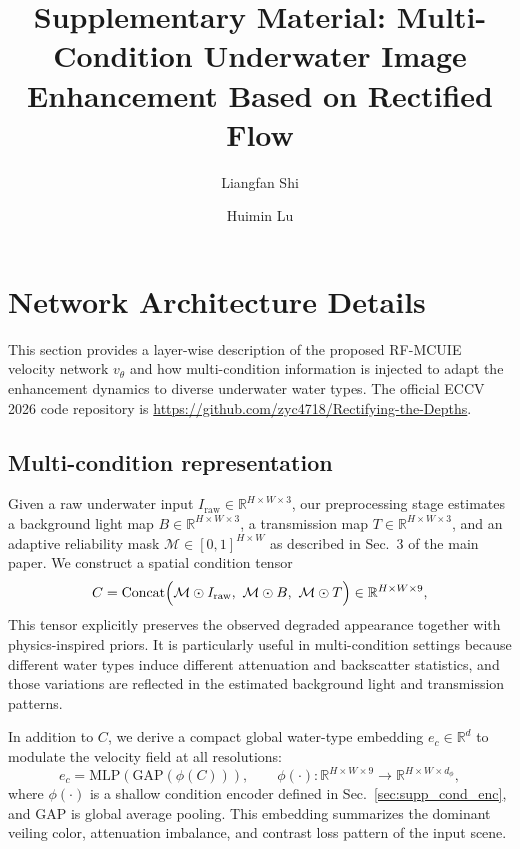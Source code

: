 \documentclass[runningheads]{llncs}
\begin{document}
\title{Supplementary Material: Multi-Condition Underwater Image Enhancement Based on Rectified Flow}

\author{Liangfan Shi \and Huimin Lu}


\maketitle

\section{Network Architecture Details}
\label{sec:supp_arch}

This section provides a layer-wise description of the proposed RF-MCUIE velocity network $v_{\theta}$ and how multi-condition information is injected to adapt the enhancement dynamics to diverse underwater water types. The official ECCV 2026 code repository is \url{https://github.com/zyc4718/Rectifying-the-Depths}.

\subsection{Multi-condition representation}
\label{sec:supp_cond_rep}

Given a raw underwater input $I_{\mathrm{raw}}\in\mathbb{R}^{H\times W\times 3}$, our preprocessing stage estimates a background light map $B\in\mathbb{R}^{H\times W\times 3}$, a transmission map $T\in\mathbb{R}^{H\times W\times 3}$, and an adaptive reliability mask $\mathcal{M}\in[0,1]^{H\times W}$ as described in Sec.~3 of the main paper. We construct a spatial condition tensor
\begin{equation}
C = \mathrm{Concat}\Bigl(\mathcal{M}\odot I_{\mathrm{raw}},\ \mathcal{M}\odot B,\ \mathcal{M}\odot T\Bigr)\in\mathbb{R}^{H\times W\times 9},
\label{eq:supp_cond_tensor}
\end{equation}
This tensor explicitly preserves the observed degraded appearance together with physics-inspired priors. It is particularly useful in multi-condition settings because different water types induce different attenuation and backscatter statistics, and those variations are reflected in the estimated background light and transmission patterns.

In addition to $C$, we derive a compact global water-type embedding $e_c\in\mathbb{R}^{d}$ to modulate the velocity field at all resolutions:
\begin{equation}
e_c = \mathrm{MLP}\!\left(\mathrm{GAP}\!\left(\phi(C)\right)\right),
\qquad \phi(\cdot):\mathbb{R}^{H\times W\times 9}\rightarrow\mathbb{R}^{H\times W\times d_\phi},
\label{eq:supp_global_cond}
\end{equation}
where $\phi(\cdot)$ is a shallow condition encoder defined in Sec.~\ref{sec:supp_cond_enc}, and $\mathrm{GAP}$ is global average pooling. This embedding summarizes the dominant veiling color, attenuation imbalance, and contrast loss pattern of the input scene.
\end{document}

